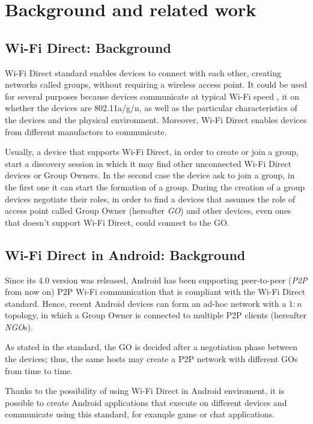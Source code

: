 \section{Background and related work} %
\subsection{Wi-Fi Direct: Background}
Wi-Fi Direct standard enables devices to connect with each other, creating 
networks called groups, without requiring a wireless access point. It could be 
used for several purposes because devices communicate at typical Wi-Fi speed 
\cite{bib:wifiP2pspec}, it on whether the devices are 802.11a/g/n, as well
as the particular characteristics of the devices and the physical environment.
Moreover, Wi-Fi Direct enables devices from different manufactors to communicate.

Usually, a device that supports Wi-Fi Direct, in order to create or join a group,
start a discovery session in which it may find other unconnected Wi-Fi Direct 
devices or Group Owners. In the second case the device ask to join a group, in the 
first one it can start the formation of a group. During the creation of a group 
devices negotiate their roles, in order to find a devices that assumes the role of 
access point called Group Owner (hereafter \textit{GO}) and other devices, even 
ones that doesn't support Wi-Fi Direct, could connect to the GO. 

\subsection{Wi-Fi Direct in Android: Background}
Since its 4.0 version was released, Android has been supporting peer-to-peer 
(\textit{P2P} from now on) P2P Wi-Fi communication that is compliant with the 
Wi-Fi Direct standard\cite{bib:wifiP2pspec}. 
Hence, recent Android devices can form an ad-hoc network with a $1:n$ topology,
in which a Group Owner is connected to multiple P2P clients (hereafter \textit{NGO}s).

As stated in the standard, the GO is decided after a negotiation phase between
the devices; thus, the same hosts may create a P2P network with different GOs
from time to time.

Thanks to the possibility of using Wi-Fi Direct in Android enviroment, it is 
possible to create Android applications that execute on different devices and 
communicate using this standard, for example game or chat applications. 

